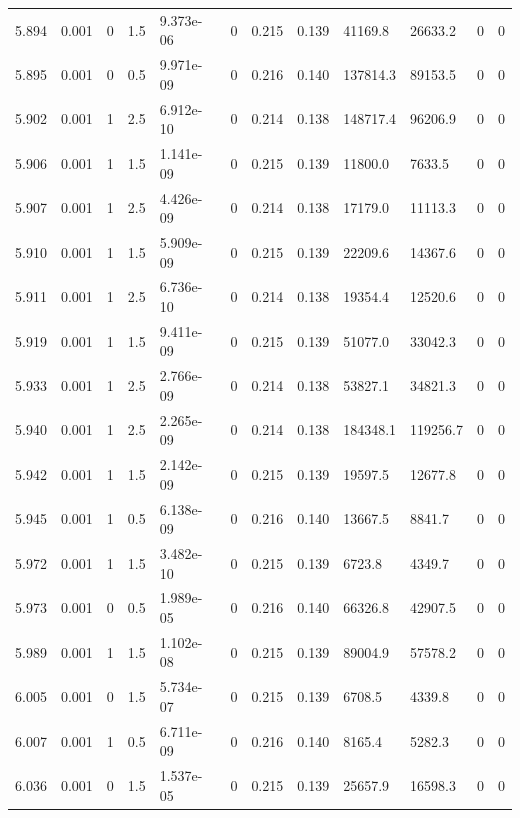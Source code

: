 \documentclass[preview]{standalone}
\begin{document}
{{{{{{{{{{\begin{tabular}{L{1.2cm}C{1.2cm} C{0.3cm}C{0.5cm} C{1.4cm}C{1.4cm} C{1.4cm}C{1.4cm} C{1.6cm}C{1.6cm} C{1.6cm}C{1.6cm}}
  5.894  &  0.001  & 0     & 1.5 &  9.373e-06  & 0  &  0.215&   0.139& 41169.8 & 26633.2   &  0 & 0  \\ 
  5.895  &  0.001  & 0     & 0.5 &  9.971e-09  & 0  &  0.216&   0.140& 137814.3 & 89153.5   &  0 & 0  \\ 
  5.902  &  0.001  & 1     & 2.5 &  6.912e-10  & 0  &  0.214&   0.138& 148717.4 & 96206.9   &  0 & 0  \\ 
  5.906  &  0.001  & 1     & 1.5 &  1.141e-09  & 0  &  0.215&   0.139& 11800.0 & 7633.5   &  0 & 0  \\ 
  5.907  &  0.001  & 1     & 2.5 &  4.426e-09  & 0  &  0.214&   0.138& 17179.0 & 11113.3   &  0 & 0  \\ 
  5.910  &  0.001  & 1     & 1.5 &  5.909e-09  & 0  &  0.215&   0.139& 22209.6 & 14367.6   &  0 & 0  \\ 
  5.911  &  0.001  & 1     & 2.5 &  6.736e-10  & 0  &  0.214&   0.138& 19354.4 & 12520.6   &  0 & 0  \\ 
  5.919  &  0.001  & 1     & 1.5 &  9.411e-09  & 0  &  0.215&   0.139& 51077.0 & 33042.3   &  0 & 0  \\ 
  5.933  &  0.001  & 1     & 2.5 &  2.766e-09  & 0  &  0.214&   0.138& 53827.1 & 34821.3   &  0 & 0  \\ 
  5.940  &  0.001  & 1     & 2.5 &  2.265e-09  & 0  &  0.214&   0.138& 184348.1 & 119256.7   &  0 & 0  \\ 
  5.942  &  0.001  & 1     & 1.5 &  2.142e-09  & 0  &  0.215&   0.139& 19597.5 & 12677.8   &  0 & 0  \\ 
  5.945  &  0.001  & 1     & 0.5 &  6.138e-09  & 0  &  0.216&   0.140& 13667.5 & 8841.7   &  0 & 0  \\ 
  5.972  &  0.001  & 1     & 1.5 &  3.482e-10  & 0  &  0.215&   0.139& 6723.8 & 4349.7   &  0 & 0  \\ 
  5.973  &  0.001  & 0     & 0.5 &  1.989e-05  & 0  &  0.216&   0.140& 66326.8 & 42907.5   &  0 & 0  \\ 
  5.989  &  0.001  & 1     & 1.5 &  1.102e-08  & 0  &  0.215&   0.139& 89004.9 & 57578.2   &  0 & 0  \\ 
  6.005  &  0.001  & 0     & 1.5 &  5.734e-07  & 0  &  0.215&   0.139& 6708.5 & 4339.8   &  0 & 0  \\ 
  6.007  &  0.001  & 1     & 0.5 &  6.711e-09  & 0  &  0.216&   0.140& 8165.4 & 5282.3   &  0 & 0  \\ 
  6.036  &  0.001  & 0     & 1.5 &  1.537e-05  & 0  &  0.215&   0.139& 25657.9 & 16598.3   &  0 & 0  \\ 

\end{tabular}}}}}}}}}}}
\end{document}
